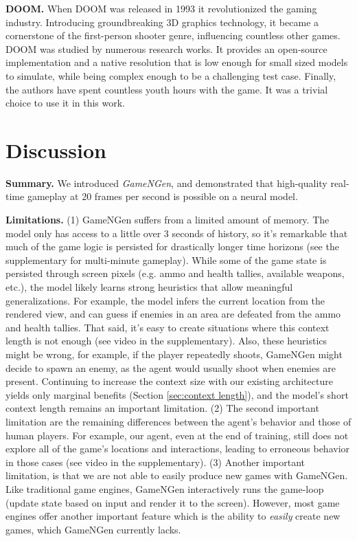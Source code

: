 \documentclass{article} %
\begin{document}
\textbf{DOOM.} When DOOM was released in 1993 it revolutionized the gaming industry.
Introducing groundbreaking 3D graphics technology, it became a cornerstone of the first-person shooter genre, influencing countless other games.
DOOM was studied by numerous research works.
It provides an open-source implementation and a native resolution that is low enough for small sized models to simulate, while being complex enough to be a challenging test case.
Finally, the authors have spent countless youth hours with the game.
It was a trivial choice to use it in this work.


\section{Discussion}
\label{sec:discussion}

\textbf{Summary.} We introduced \emph{GameNGen}, and demonstrated that high-quality real-time gameplay at 20 frames per second is possible on a neural model.

\textbf{Limitations.} (1) GameNGen suffers from a limited amount of memory.
The model only has access to a little over 3 seconds of history, so it's remarkable that much of the game logic is persisted for drastically longer time horizons (see the supplementary for multi-minute gameplay).
While some of the game state is persisted through screen pixels  (e.g. ammo and health tallies, available weapons, etc.), the model likely learns strong heuristics that allow meaningful generalizations.
For example, the model infers the current location from the rendered view, and can guess if enemies in an area are defeated from the ammo and health tallies.
That said, it's easy to create situations where this context length is not enough (see video in the supplementary).
Also, these heuristics might be wrong, for example, if the player repeatedly shoots, GameNGen might decide to spawn an enemy, as the agent would usually shoot when enemies are present.
Continuing to increase the context size with our existing architecture yields only marginal benefits (Section \ref{sec:context length}), and the model's short context length remains an important limitation.
(2) The second important limitation are the remaining differences between the agent's behavior and those of human players. For example, our agent, even at the end of training, still does not explore all of the game's locations and interactions, leading to erroneous behavior in those cases (see video in the supplementary).
(3) Another important limitation, is that we are not able to easily produce new games with GameNGen. Like traditional game engines, GameNGen interactively runs the game-loop (update state based on input and render it to the screen). However, most game engines offer another important feature which is the ability to \emph{easily} create new games, which GameNGen currently lacks.
\end{document}
